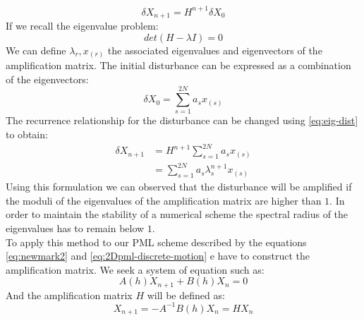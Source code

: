 \begin{equation}
\delta X_{n+1} = H^{n+1} \delta X_0
\end{equation}
If we recall the eigenvalue problem:
\begin{equation}
det(H-\lambda I) = 0
\end{equation}
We can define $\lambda_r, x_{(r)}$ the associated eigenvalues and eigenvectors of the amplification matrix.
The initial disturbance can be expressed as a combination of the eigenvectors:
\begin{equation}
\delta X_0 = \sum^{2N}_{s=1} a_s x_{(s)}
\label{eq:eig-dist}
\end{equation}
The recurrence relationship for the disturbance can be changed using \ref{eq:eig-dist} to obtain:
\begin{align}
\delta X_{n+1} &= H^{n+1} \sum^{2N}_{s=1} a_s x_{(s)} \\
&= \sum^{2N}_{s=1} a_s \lambda_s^{n+1} x_{(s)}
\end{align} 
Using this formulation we can observed that the disturbance will be amplified if the moduli of the eigenvalues of the amplification matrix are higher than $1$. In order to maintain the stability of a numerical scheme the spectral radius of the eigenvalues has to remain below $1$. \\
 
To apply this method to our PML scheme described by the equations \ref{eq:newmark2} and \ref{eq:2Dpml-discrete-motion} e have to construct the amplification matrix. We seek a system of equation such as:
\begin{equation}
 A(h) X_{n+1}  + B(h) X_{n} = 0  
\end{equation}
And the amplification matrix $H$ will be defined as:
\begin{equation}
 X_{n+1} = - A^{-1} B(h) X_{n} = H X_{n}  
\end{equation}
